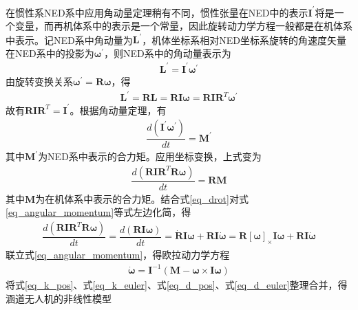 在惯性系NED系中应用角动量定理稍有不同，惯性张量在NED中的表示$ {\bm{I}}^{'} $将是一个变量，而再机体系中的表示是一个常量，因此旋转动力学方程一般都是在机体系中表示。记NED系中角动量为$ {\bm{L}}^{'} $，机体坐标系相对NED坐标系旋转的角速度矢量在NED系中的投影为$ {\bm{\omega}}^{'} $，则NED系中的角动量表示为
\begin{align}
{\bm{L}}^{'} ={\bm{I}}^{'} {\bm{\omega}}^{'}
\end{align}
由旋转变换关系$ {\bm{\omega}}^{'}=\bm{R} \bm{\omega} $，得
\begin{align}
{\bm{L}}^{'}=\bm{R} \bm{L}=\bm{R} \bm{I} \bm{\omega}=\bm{R} \bm{I} \bm{R}^T {\bm{\omega}}^{'}
\end{align}
故有$ \bm{R} \bm{I} \bm{R}^T= {\bm{I}}^{'}  $。根据角动量定理，有
\begin{align}
\dfrac{d({\bm{I}}^{'} {\bm{\omega}}^{'})}{d t}={\bm{M}}^{'}
\end{align}
其中$ {\bm{M}}^{'} $为NED系中表示的合力矩。应用坐标变换，上式变为
\begin{align}
\dfrac{d(\bm{R} \bm{I} \bm{R}^T \bm{R} \bm{\omega})}{d t} = \bm{R} \bm{M} \label{eq_angular_momentum}
\end{align}
其中$ \bm{M} $为在机体系中表示的合力矩。结合式\eqref{eq_drot}对式\eqref{eq_angular_momentum}等式左边化简，得
\begin{align}
\dfrac{d(\bm{R} \bm{I} \bm{R}^T \bm{R} \bm{\omega})}{d t}=\dfrac{d(\bm{R} \bm{I} \bm{\omega})}{d t}=\dot{\bm{R}} \bm{I} \bm{\omega} + \bm{R} \bm{I} \dot{\bm{\omega}} = \bm{R}[\bm{\omega}]_{\times} \bm{I} \bm{\omega} + \bm{R} \bm{I} \dot{\bm{\omega}}
\end{align}
联立式\eqref{eq_angular_momentum}，得欧拉动力学方程
\begin{align}
\dot{\bm{\omega}} = \bm{I}^{-1}(\bm{M}-\bm{\omega} \times \bm{I} \bm{\omega}) \label{eq_d_euler} 
\end{align}
将式\eqref{eq_k_pos}、式\eqref{eq_k_euler}、式\eqref{eq_d_pos}、式\eqref{eq_d_euler}整理合并，得涵道无人机的非线性模型\cite{Pflimlin_2007a,Zhao_2015}
